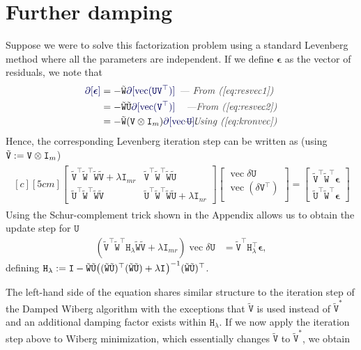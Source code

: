 \documentclass[runningheads]{llncs}
\def\eqref#1{(\ref{eq:#1})}
\def\tr{^\top}
\def\xcomment#1{\textcolor[gray]{.2}{\text{\em---#1}}}
\def\comment#1{\kern-1cm\xcomment{#1}}
\def\vec{\operatorname{vec}}
\def\m#1{\ensuremath{\mathtt{#1}}}
\def\mU{\m U}
\def\mV{\m V}
\def\mW{\m W}
\def\verr{\boldsymbol \epsilon}
\def\twiddle#1{{\tilde{#1}}}
\def\tU{\twiddle\mU}
\def\tW{\twiddle\mW}
\def\tV{\twiddle\mV}
\begin{document}
\section{Further damping}
Suppose we were to solve this factorization problem using a standard Levenberg method where all the parameters are independent. If we define $ \verr $ as the vector of residuals, we note that
\begin{align}
\diff[\verr] &= - \tW \diff[\vec(\m U \m V \tr)] & \comment{ From \eqref{resvec1} }
\\ &= - \tW \tU \diff[\vec (\m V \tr)] & \comment{From \eqref{resvec2}}
\\ &= - \tW (\kron{\m V}{\m I_m}) \diff[\vec \m U].
& \comment{Using \eqref{kronvec}}
\end{align}
Hence, the corresponding Levenberg iteration step can be written as (using $\tV:=\kron{\mV}{\Id m}$)
\begin{align}
\begin{multlined}[c][5cm]
\begin{bmatrix}
\tV \tr \tW \tr \tW \tV + \lambda \m I_{mr} &
\tV \tr \tW \tr \tW \tU \\
\tU \tr \tW \tr \tW \tV &
\tU \tr \tW \tr \tW \tU + \lambda \m I_{nr}
\end{bmatrix}
\begin{bmatrix}
\vec \delta \m U \\
\vec (\delta \m V \tr) \\
\end{bmatrix} =
\begin{bmatrix}
\tV \tr \tW \tr \verr \\
\tU \tr \tW \tr \verr
\end{bmatrix}
\end{multlined}
\end{align}
Using the Schur-complement trick shown in the Appendix allows us to obtain the update step for $\m U$
\begin{align}
\left( \tV \tr \tW \tr \m H_\lambda \tW \tV + \lambda \m I_{mr} \right)
\vec {\delta \m U} &= \tV \tr \m H_\lambda \tr \verr,
\end{align}
defining $\m H_\lambda := 
\m I - \tW \tU \bigl((\tW \tU)\tr(\tW \tU)+\lambda\Id{}\bigr)^{-1}(\tW \tU)\tr$.

The left-hand side of the equation shares similar structure to the iteration step of the Damped Wiberg algorithm \cite{okatani2011efficient} with the exceptions that $\tV$ is used instead of $ \tilde{\m V}^* $ and an additional damping factor exists within $ \m H_\lambda $. If we now apply the iteration step above to Wiberg minimization, which essentially changes $\tV$ to $\tilde{\m V}^*$, we obtain
\end{document}
